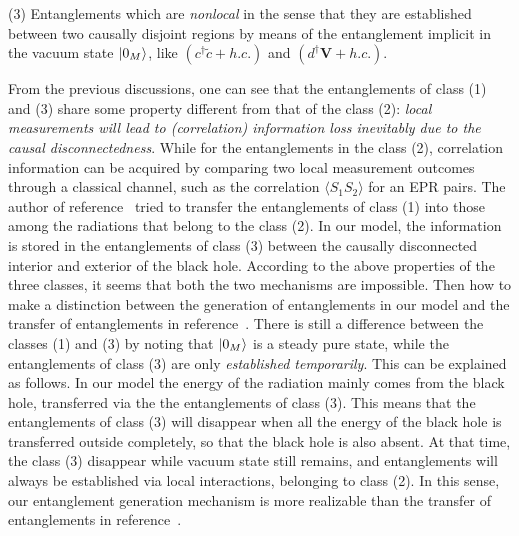 \documentclass[12pt,a4paper]{article}
\begin{document}
(3) Entanglements which are \emph{nonlocal} in the sense that they are established between two causally disjoint regions by means of the entanglement implicit in the
vacuum state $\arrowvert0_{M}\rangle$, like
$(c^{\dag}\tilde{c}+h.c.)$ and $(d^{\dag}\mathbf{V}+h.c.)$.

From the previous discussions, one can see that the entanglements of class (1) and (3) share some property different from that of the class (2): \emph{local measurements will lead to (correlation) information loss inevitably due to the causal disconnectedness}. While for the entanglements in the class (2), correlation information can be acquired by comparing two local measurement outcomes through a classical channel, such as the correlation $\langle S_1S_2\rangle$ for an EPR pairs. The author of reference~\cite{g} tried to transfer the entanglements of class (1) into those among the radiations that belong to the class (2). In our model, the information is stored in the entanglements of class (3) between the causally disconnected interior and exterior of the black hole. According to the above properties of the three classes, it seems that both the two mechanisms are impossible. Then how to make a distinction between the generation of entanglements in our model and the transfer of entanglements in reference~\cite{g}. There is still a difference between the classes (1) and (3) by noting that $\arrowvert0_{M}\rangle$ is a steady pure state, while the entanglements of class (3) are only \emph{established temporarily}. This can be explained as follows. In our model the energy of the radiation mainly comes from the black hole, transferred via the the entanglements of class (3). This means that the entanglements of class (3) will disappear when all the energy of the black hole is transferred outside completely, so that the black hole is also absent. At that time, the class (3) disappear while vacuum state still remains, and entanglements will always be established via local interactions, belonging to class (2). In this sense, our entanglement generation mechanism is more realizable than the transfer of entanglements in reference~\cite{g}.
\end{document}
